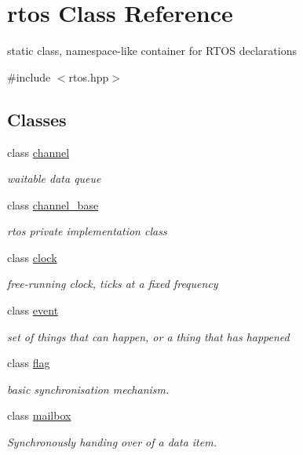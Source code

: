\hypertarget{classrtos}{}\section{rtos Class Reference}
\label{classrtos}


static class, namespace-\/like container for R\+T\+OS declarations  




{\ttfamily \#include $<$rtos.\+hpp$>$}

\subsection*{Classes}
\begin{DoxyCompactItemize}
\item 
class \hyperlink{classrtos_1_1channel}{channel}
\begin{DoxyCompactList}\small\item\em waitable data queue \end{DoxyCompactList}\item 
class \hyperlink{classrtos_1_1channel__base}{channel\+\_\+base}
\begin{DoxyCompactList}\small\item\em rtos private implementation class \end{DoxyCompactList}\item 
class \hyperlink{classrtos_1_1clock}{clock}
\begin{DoxyCompactList}\small\item\em free-\/running clock, ticks at a fixed frequency \end{DoxyCompactList}\item 
class \hyperlink{classrtos_1_1event}{event}
\begin{DoxyCompactList}\small\item\em set of things that can happen, or a thing that has happened \end{DoxyCompactList}\item 
class \hyperlink{classrtos_1_1flag}{flag}
\begin{DoxyCompactList}\small\item\em basic synchronisation mechanism. \end{DoxyCompactList}\item 
class \hyperlink{classrtos_1_1mailbox}{mailbox}
\begin{DoxyCompactList}\small\item\em Synchronously handing over of a data item. \end{DoxyCompactList}\item 

\end{DoxyCompactItemize}

